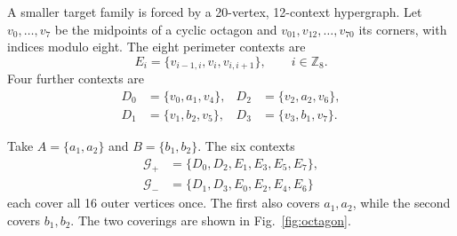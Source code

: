 \documentclass[
  twocolumn,
  aps,
  pra,
  floatfix,
  amsmath,amssymb,
  longbibliography
]{revtex4-2}
\theoremstyle{definition}
\theoremstyle{remark}
\begin{document}
A smaller target family is forced by a 20-vertex, 12-context hypergraph.  Let
$v_0,\ldots,v_7$ be the midpoints of a cyclic octagon and
$v_{01},v_{12},\ldots,v_{70}$ its corners, with indices modulo eight.  The
eight perimeter contexts are
\begin{equation}
 E_i=\{v_{i-1,i},v_i,v_{i,i+1}\},\qquad i\in\mathbb Z_8.
 \label{eq:octagon-perimeter}
\end{equation}
Four further contexts are
\begin{align}
 D_0&=\{v_0,a_1,v_4\},&D_2&=\{v_2,a_2,v_6\},\nonumber\\
 D_1&=\{v_1,b_2,v_5\},&D_3&=\{v_3,b_1,v_7\}.
 \label{eq:octagon-inner}
\end{align}

Take $A=\{a_1,a_2\}$ and $B=\{b_1,b_2\}$.  The six contexts
\begin{align}
 \mathcal G_+&=\{D_0,D_2,E_1,E_3,E_5,E_7\},\nonumber\\
 \mathcal G_-&=\{D_1,D_3,E_0,E_2,E_4,E_6\}
 \label{eq:octagon-covers}
\end{align}
each cover all 16 outer vertices once.  The first also covers $a_1,a_2$,
while the second covers $b_1,b_2$.  The two coverings are shown in
Fig.~\ref{fig:octagon}.
\end{document}
